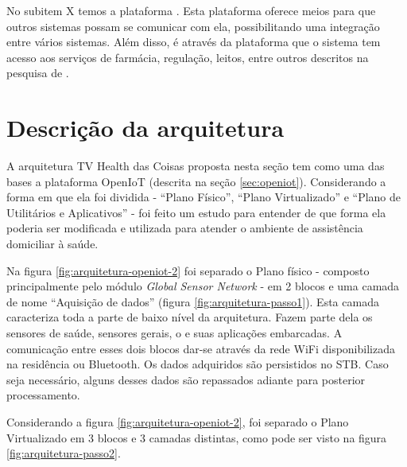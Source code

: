 No subitem X temos a plataforma \nextsaude[]. Esta plataforma oferece meios
para que outros sistemas possam se comunicar com ela, possibilitando uma
integração entre vários sistemas. Além disso, é através da plataforma que o
sistema tem acesso aos serviços de farmácia, regulação, leitos, entre outros
descritos na pesquisa de .

\section{Descrição da arquitetura}
\label{sec:descricao-solucao}

A arquitetura TV Health das Coisas proposta nesta seção tem como uma das bases
a plataforma OpenIoT (descrita na seção \vref{sec:openiot}). Considerando a
forma em que ela foi dividida - ``Plano Físico'', ``Plano Virtualizado'' e
``Plano de Utilitários e Aplicativos'' - foi feito um estudo para entender de
que forma ela poderia ser modificada e utilizada para atender o ambiente de
assistência domiciliar à saúde.


Na figura \ref{fig:arquitetura-openiot-2} foi separado o Plano físico -
composto principalmente pelo módulo \textit{Global Sensor Network} -
em 2 blocos e uma camada de nome ``Aquisição de dados'' (figura
\ref{fig:arquitetura-passo1}). Esta camada caracteriza toda a parte de baixo
nível da arquitetura. Fazem parte dela os sensores de saúde, sensores gerais, o
\stb[] e suas aplicações embarcadas. A comunicação entre esses dois blocos
dar-se através da rede WiFi disponibilizada na residência ou Bluetooth. Os
dados adquiridos são persistidos no STB. Caso seja necessário, alguns desses
dados são repassados adiante para posterior processamento. 


Considerando a figura \ref{fig:arquitetura-openiot-2}, foi separado o Plano
Virtualizado em 3 blocos e 3 camadas distintas, como pode ser visto na figura
\ref{fig:arquitetura-passo2}. 


